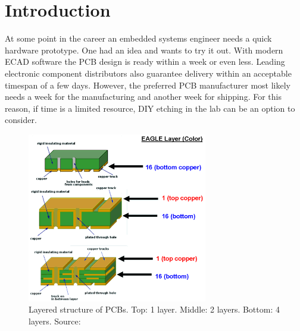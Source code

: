 
\chapter{Introduction} 
\label{chap:introduction} 
At some point in the career an embedded systems engineer needs a quick hardware prototype. One had an idea and wants to try it out. With modern \gls{ECAD} software the \gls{PCB} design is ready within a week or even less. Leading electronic component distributors also guarantee delivery within an acceptable timespan of a few days. However, the preferred \gls{PCB} manufacturer most likely needs a week for the manufacturing and another week for shipping. For this reason, if time is a limited resource, \gls{DIY} etching in the lab can be an option to consider. 

\begin{figure}[H]                                                         
\centering          
\includegraphics[width=0.7\textwidth]{./fig/PCBLayers}   
\caption[Layered structure of \glspl{PCB}.]{Layered structure of \glspl{PCB}. Top: 1 layer. Middle: 2 layers. Bottom: 4 layers. Source: \cite{online:pcblayers}}   
\label{fig:pcblayers}                                                       
\end{figure}  

